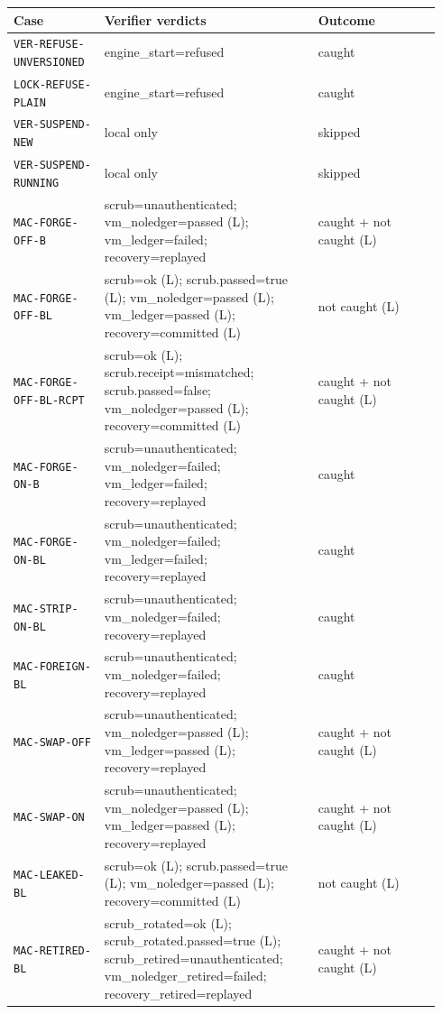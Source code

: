 
\begin{tabular}{@{}p{0.2\linewidth}p{0.47\linewidth}p{0.27\linewidth}@{}}
\toprule
Case & Verifier verdicts & Outcome \\
\midrule
\texttt{VER-REFUSE-UNVERSIONED} & engine\_start=refused & caught \\
\texttt{LOCK-REFUSE-PLAIN} & engine\_start=refused & caught \\
\texttt{VER-SUSPEND-NEW} & local only & skipped \\
\texttt{VER-SUSPEND-RUNNING} & local only & skipped \\
\texttt{MAC-FORGE-OFF-B} & scrub=unauthenticated; vm\_noledger=passed (L); vm\_ledger=failed; recovery=replayed & caught + not caught (L) \\
\texttt{MAC-FORGE-OFF-BL} & scrub=ok (L); scrub.passed=true (L); vm\_noledger=passed (L); vm\_ledger=passed (L); recovery=committed (L) & not caught (L) \\
\texttt{MAC-FORGE-OFF-BL-RCPT} & scrub=ok (L); scrub.receipt=mismatched; scrub.passed=false; vm\_noledger=passed (L); recovery=committed (L) & caught + not caught (L) \\
\texttt{MAC-FORGE-ON-B} & scrub=unauthenticated; vm\_noledger=failed; vm\_ledger=failed; recovery=replayed & caught \\
\texttt{MAC-FORGE-ON-BL} & scrub=unauthenticated; vm\_noledger=failed; vm\_ledger=failed; recovery=replayed & caught \\
\texttt{MAC-STRIP-ON-BL} & scrub=unauthenticated; vm\_noledger=failed; recovery=replayed & caught \\
\texttt{MAC-FOREIGN-BL} & scrub=unauthenticated; vm\_noledger=failed; recovery=replayed & caught \\
\texttt{MAC-SWAP-OFF} & scrub=unauthenticated; vm\_noledger=passed (L); vm\_ledger=passed (L); recovery=replayed & caught + not caught (L) \\
\texttt{MAC-SWAP-ON} & scrub=unauthenticated; vm\_noledger=passed (L); vm\_ledger=passed (L); recovery=replayed & caught + not caught (L) \\
\texttt{MAC-LEAKED-BL} & scrub=ok (L); scrub.passed=true (L); vm\_noledger=passed (L); recovery=committed (L) & not caught (L) \\
\texttt{MAC-RETIRED-BL} & scrub\_rotated=ok (L); scrub\_rotated.passed=true (L); scrub\_retired=unauthenticated; vm\_noledger\_retired=failed; recovery\_retired=replayed & caught + not caught (L) \\

\end{tabular}
